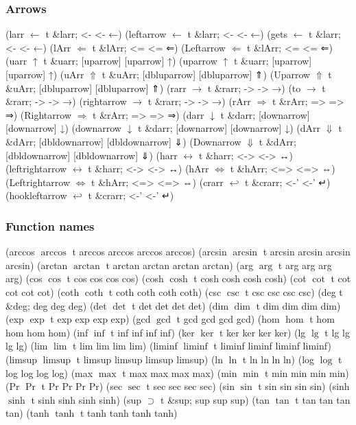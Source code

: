 \documentclass[11pt]{article}
\begin{document}
\subsubsection{Arrows}
\label{sec-1-3-6}
(larr $\leftarrow$ t \&larr; <- <- ←)
(leftarrow $\leftarrow$ t \&larr; <- <- ←)
(gets $\gets$ t \&larr; <- <- ←)
(lArr $\Leftarrow$ t \&lArr; <= <= ⇐)
(Leftarrow $\Leftarrow$ t \&lArr; <= <= ⇐)
(uarr $\uparrow$ t \&uarr; [uparrow] [uparrow] ↑)
(uparrow $\uparrow$ t \&uarr; [uparrow] [uparrow] ↑)
(uArr $\Uparrow$ t \&uArr; [dbluparrow] [dbluparrow] ⇑)
(Uparrow $\Uparrow$ t \&uArr; [dbluparrow] [dbluparrow] ⇑)
(rarr $\rightarrow$ t \&rarr; -> -> →)
(to $\to$ t \&rarr; -> -> →)
(rightarrow $\rightarrow$ t \&rarr; -> -> →)
(rArr $\Rightarrow$ t \&rArr; => => ⇒)
(Rightarrow $\Rightarrow$ t \&rArr; => => ⇒)
(darr $\downarrow$ t \&darr; [downarrow] [downarrow] ↓)
(downarrow $\downarrow$ t \&darr; [downarrow] [downarrow] ↓)
(dArr $\Downarrow$ t \&dArr; [dbldownarrow] [dbldownarrow] ⇓)
(Downarrow $\Downarrow$ t \&dArr; [dbldownarrow] [dbldownarrow] ⇓)
(harr $\leftrightarrow$ t \&harr; <-> <-> ↔)
(leftrightarrow $\leftrightarrow$ t \&harr; <-> <-> ↔)
(hArr $\Leftrightarrow$ t \&hArr; <=> <=> ⇔)
(Leftrightarrow $\Leftrightarrow$ t \&hArr; <=> <=> ⇔)
(crarr $\hookleftarrow$ t \&crarr; <-' <-' ↵)
(hookleftarrow $\hookleftarrow$ t \&crarr; <-' <-' ↵)

\subsubsection{Function names}
\label{sec-1-3-7}
(arccos $\arccos$ t arccos arccos arccos arccos)
(arcsin $\arcsin$ t arcsin arcsin arcsin arcsin)
(arctan $\arctan$ t arctan arctan arctan arctan)
(arg $\arg$ t arg arg arg arg)
(cos $\cos$ t cos cos cos cos)
(cosh $\cosh$ t cosh cosh cosh cosh)
(cot $\cot$ t cot cot cot cot)
(coth $\coth$ t coth coth coth coth)
(csc $\csc$ t csc csc csc csc)
(deg \textdegree{} t \&deg; deg deg deg)
(det $\det$ t det det det det)
(dim $\dim$ t dim dim dim dim)
(exp $\exp$ t exp exp exp exp)
(gcd $\gcd$ t gcd gcd gcd gcd)
(hom $\hom$ t hom hom hom hom)
(inf $\inf$ t inf inf inf inf)
(ker $\ker$ t ker ker ker ker)
(lg $\lg$ t lg lg lg lg)
(lim $\lim$ t lim lim lim lim)
(liminf $\liminf$ t liminf liminf liminf liminf)
(limsup $\limsup$ t limsup limsup limsup limsup)
(ln $\ln$ t ln ln ln ln)
(log $\log$ t log log log log)
(max $\max$ t max max max max)
(min $\min$ t min min min min)
(Pr $\Pr$ t Pr Pr Pr Pr)
(sec $\sec$ t sec sec sec sec)
(sin $\sin$ t sin sin sin sin)
(sinh $\sinh$ t sinh sinh sinh sinh)
(sup $\supset$ t \&sup; sup sup sup)
(tan $\tan$ t tan tan tan tan)
(tanh $\tanh$ t tanh tanh tanh tanh)
\end{document}
